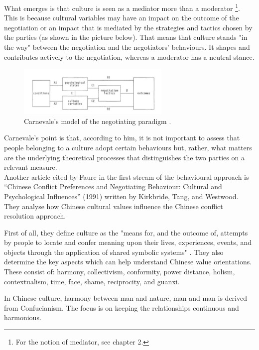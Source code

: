 \documentclass[../main.tex]{subfiles}
\begin{document}
What emerges is that culture is seen as a mediator more than a moderator \autocite[321]{carnevale}\footnote{For the notion of mediator, see chapter 2.}. This is because cultural variables may have an impact on the outcome of the negotiation or an impact that is mediated by the strategies and tactics chosen by the parties (as shown in the picture below). That means that culture stands "in the way" between the negotiation and the negotiators' behaviours. It shapes and contributes actively to the negotiation, whereas a moderator has a neutral stance.

\begin{figure}[h]
    \centering\includegraphics[width=0.65\textwidth]{images/carnevale.jpg}
    \caption{Carnevale's model of the negotiating paradigm \autocite[321]{carnevale}.}
\end{figure}

Carnevale's point is that, according to him, it is not important to assess that people belonging to a culture adopt certain behaviours but, rather, what matters are the underlying theoretical processes that distinguishes the two parties on a relevant measure.\\

Another article cited by Faure in the first stream of the behavioural approach is “Chinese Conflict Preferences and Negotiating Behaviour: Cultural and Psychological Influences” (1991) written by Kirkbride, Tang, and Westwood. They analyse how Chinese cultural values influence the Chinese conflict resolution approach.

First of all, they define culture as the "means for, and the outcome of, attempts by people to locate and confer meaning upon their lives, experiences, events, and objects through the application of shared symbolic systems" \autocite[366]{tang}. They also determine the key aspects which can help understand Chinese value orientations. These consist of: harmony, collectivism, conformity, power distance, holism, contextualism, time, face, shame, reciprocity, and guanxi.

In Chinese culture, harmony between man and nature, man and man is derived from Confucianism. The focus is on keeping the relationships continuous and harmonious. 
\end{document}
